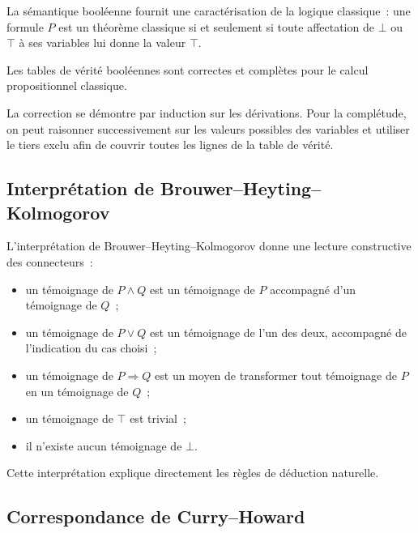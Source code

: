 La sémantique booléenne fournit une caractérisation de la logique
classique : une formule $P$ est un théorème classique si et seulement
si toute affectation de $\bot$ ou $\top$ à ses variables lui donne la
valeur $\top$.

\begin{thm}
Les tables de vérité booléennes sont correctes et complètes pour le
calcul propositionnel classique.
\end{thm}

La correction se démontre par induction sur les dérivations. Pour la
complétude, on peut raisonner successivement sur les valeurs possibles
des variables et utiliser le tiers exclu afin de couvrir toutes les
lignes de la table de vérité.

\subsection{Interprétation de Brouwer--Heyting--Kolmogorov}

\thingy L'interprétation de Brouwer--Heyting--Kolmogorov donne une
lecture constructive des connecteurs :
\begin{itemize}
\item un témoignage de $P\land Q$ est un témoignage de $P$ accompagné
  d'un témoignage de $Q$ ;
\item un témoignage de $P\lor Q$ est un témoignage de l'un des deux,
  accompagné de l'indication du cas choisi ;
\item un témoignage de $P\Rightarrow Q$ est un moyen de transformer
  tout témoignage de $P$ en un témoignage de $Q$ ;
\item un témoignage de $\top$ est trivial ;
\item il n'existe aucun témoignage de $\bot$.
\end{itemize}
Cette interprétation explique directement les règles de déduction
naturelle.

\subsection{Correspondance de Curry--Howard}


